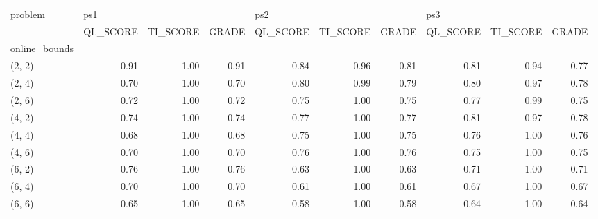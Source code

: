 \begin{tabular}{lrrrrrrrrr}
\toprule
problem & \multicolumn{3}{l}{ps1} & \multicolumn{3}{l}{ps2} & \multicolumn{3}{l}{ps3} \\
{} & QL\_SCORE & TI\_SCORE & GRADE & QL\_SCORE & TI\_SCORE & GRADE & QL\_SCORE & TI\_SCORE & GRADE \\
online\_bounds &          &          &       &          &          &       &          &          &       \\
\midrule
(2, 2)        &     0.91 &     1.00 &  0.91 &     0.84 &     0.96 &  0.81 &     0.81 &     0.94 &  0.77 \\
(2, 4)        &     0.70 &     1.00 &  0.70 &     0.80 &     0.99 &  0.79 &     0.80 &     0.97 &  0.78 \\
(2, 6)        &     0.72 &     1.00 &  0.72 &     0.75 &     1.00 &  0.75 &     0.77 &     0.99 &  0.75 \\
(4, 2)        &     0.74 &     1.00 &  0.74 &     0.77 &     1.00 &  0.77 &     0.81 &     0.97 &  0.78 \\
(4, 4)        &     0.68 &     1.00 &  0.68 &     0.75 &     1.00 &  0.75 &     0.76 &     1.00 &  0.76 \\
(4, 6)        &     0.70 &     1.00 &  0.70 &     0.76 &     1.00 &  0.76 &     0.75 &     1.00 &  0.75 \\
(6, 2)        &     0.76 &     1.00 &  0.76 &     0.63 &     1.00 &  0.63 &     0.71 &     1.00 &  0.71 \\
(6, 4)        &     0.70 &     1.00 &  0.70 &     0.61 &     1.00 &  0.61 &     0.67 &     1.00 &  0.67 \\
(6, 6)        &     0.65 &     1.00 &  0.65 &     0.58 &     1.00 &  0.58 &     0.64 &     1.00 &  0.64 \\
\bottomrule
\end{tabular}
